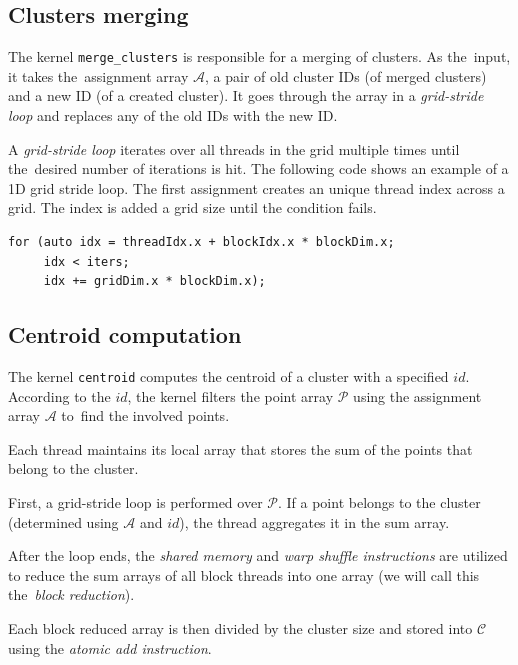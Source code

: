 \subsection{Clusters merging}


The kernel \texttt{merge\_clusters} is responsible for a merging of clusters. As the~input, it takes the~assignment array $\mathcal{A}$, a pair of old cluster IDs (of merged clusters) and a new ID (of a created cluster). It goes through the array in a \emph{grid-stride loop} and replaces any of the old IDs with the new ID.

\begin{defn}
	A \emph{grid-stride loop} iterates over all threads in the grid multiple times until the~desired number of iterations is hit. The following code shows an example of a 1D grid stride loop. The first assignment creates an unique thread index across a grid. The index is added a grid size until the condition fails.
	\label{def03:grid-stride}
\end{defn}

\begin{lstlisting}
for (auto idx = threadIdx.x + blockIdx.x * blockDim.x; 
     idx < iters; 
     idx += gridDim.x * blockDim.x);
\end{lstlisting}

\subsection{Centroid computation}

The kernel \texttt{centroid} computes the centroid of a cluster with a specified $id$. According to the $id$, the kernel filters the point array $\mathcal{P}$ using the assignment array $\mathcal{A}$ to~find the involved points.

Each thread maintains its local array that stores the sum of the points that belong to the cluster. 

First, a grid-stride loop is performed over $\mathcal{P}$. If a point belongs to the cluster (determined using $\mathcal{A}$ and $id$), the thread aggregates it in the sum array. 

After the loop ends, the \emph{shared memory} and \emph{warp shuffle instructions} are utilized to reduce the sum arrays of all block threads into one array (we will call this the~\emph{block reduction}).

Each block reduced array is then divided by the cluster size and stored into $\mathcal{C}$ using the \emph{atomic add instruction}. 

